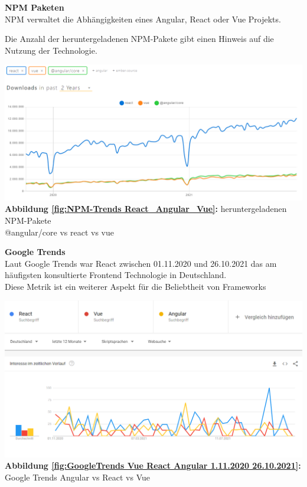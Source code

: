 {\cite{GH04, GH05, GH06}}


\textbf{NPM Paketen}\\
NPM verwaltet die Abhängigkeiten eines Angular, React oder Vue Projekts.

Die Anzahl der heruntergeladenen NPM-Pakete gibt einen Hinweis auf die Nutzung der Technologie.

\begin{center}
  \includegraphics[scale=0.4]{sources/NPM-Trends React_Angular_Vue}\label{fig:NPM-Trends React_Angular_Vue}\\
  \textbf{Abbildung \autoref{fig:NPM-Trends React_Angular_Vue}:} heruntergeladenen NPM-Pakete \\@angular/core vs react vs vue
    {\cite{NPM01}}
\end{center}

\textbf{Google Trends}\\
Laut Google Trends war React zwischen 01.11.2020 und 26.10.2021 das am häufigsten konsultierte Frontend Technologie in Deutschland.
\\
Diese Metrik ist ein weiterer Aspekt für die Beliebtheit von Frameworks
\begin{center}
  \includegraphics[scale=0.5]{sources/GoogleTrends Vue React Angular 1.11.2020 26.10.2021}\label{fig:GoogleTrends Vue React Angular 1.11.2020 26.10.2021}\\
  \textbf{Abbildung \autoref{fig:GoogleTrends Vue React Angular 1.11.2020 26.10.2021}:} Google Trends Angular vs React vs Vue
    {\cite{GO01}}
\end{center}

